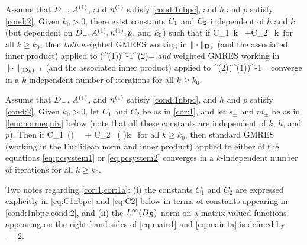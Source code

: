 \label{cor:1}
Assume that $D_{-}$, ${A}^{(1)}$, and ${n}^{(1)}$ satisfy \cref{cond:1nbpc}, and $h$ and $p$ satisfy \cref{cond:2}. Given $k_0>0$, there exist constants $C_{1}$ and $C_{2}$  independent of $h$ and $k$ (but dependent on $D_{-}, {A}^{(1)}, {n}^{(1)}, p$, and $k_{0}$) such that if 
\beq\label{eq:cond}
C_1 \,k \,\NLiDRRRdtd{\Aso-\Ast} +C_2 \, k\, \NLiDRRR{\nso-\nst}
\leq {}
\eeq
for all $k\geq k_0$, then \emph{both} weighted GMRES working in $\|\cdot\|_{\mathbf{D}_k}$ (and the associated inner product) applied to 
\beq\label{eq:pcsystem1}
(\Amat^{(1)})^{-1}\Amat^{(2)}\bu = \bff
\eeq
\emph{and} weighted GMRES working in $\|\cdot\|_{(\mathbf{D}_k)^{-1}}$ (and the associated inner product) applied to 
\beq\label{eq:pcsystem2}
\Amat^{(2)}(\Amat^{(1)})^{-1}\bv = \bff
\eeq
 converge in a $k$-independent number of iterations for all $k\geq k_0$.
\enth

\label{cor:1a}
Assume that $D_{-}$, ${A}^{(1)}$, and ${n}^{(1)}$ satisfy \cref{cond:1nbpc}, and $h$ and $p$ satisfy \cref{cond:2}. Given $k_0>0$,
let $C_1$ and $C_2$ be as in \cref{cor:1}, and let $s_{\pm}$ and $m_{\pm}$ be as in \cref{lem:normequiv} below (note that all these constants are independent of $k$, $h$, and $p$). Then if 
\beq\label{eq:conda}
 C_1 \,\left(\right) \, \,
\NLiDRRRdtd{\Aso-\Ast} + C_2 \, \left( \right)k \, \NLiDRRR{\nso-\nst}
\leq {}
\eeq
for all $k\geq k_0$, then standard GMRES (working in the Euclidean norm and inner product) applied to either of the equations \cref{eq:pcsystem1} or \cref{eq:pcsystem2}
 converges in a $k$-independent number of iterations for all $k\geq k_0$.
\enth

Two notes regarding \cref{cor:1,cor:1a}: (i) the constants $C_1$ and $C_2$ are expressed explicitly in \cref{eq:C1nbpc} and \cref{eq:C2} below in terms of constants appearing in \cref{cond:1nbpc,cond:2}, and (ii) the $L^\infty(D_{R})$ norm on a matrix-valued functions appearing on the right-hand sides of \cref{eq:main1} and \cref{eq:main1a} is defined by
\beqs
{}\de \esssup_{\bx\in\DR}_2.
\eeqs


